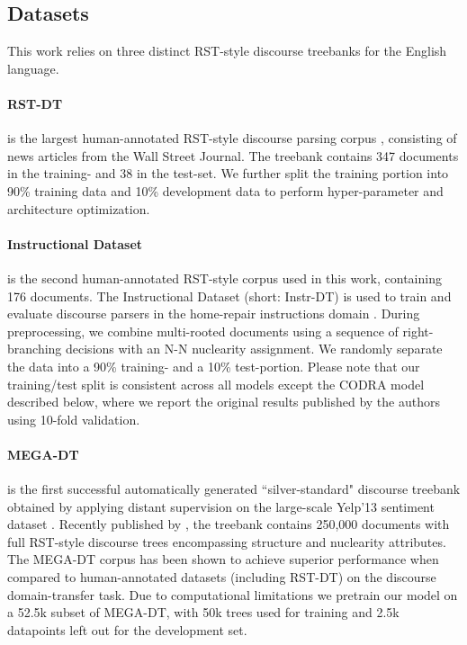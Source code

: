 \documentclass[11pt]{article}
\begin{document}
\subsection{Datasets}
\label{datasets}
This work relies on three distinct RST-style discourse treebanks for the English language. 

\paragraph{RST-DT} is the largest human-annotated RST-style discourse parsing corpus \cite{carlson2002rst}, consisting of news articles from the Wall Street Journal. The treebank contains 347 documents in the training- and 38 in the test-set. 
We further split the training portion into 90\% training data and 10\% development data to perform hyper-parameter and architecture optimization.

\paragraph{Instructional  Dataset} is the second human-annotated RST-style corpus used in this work, containing 176 documents. The Instructional Dataset (short: Instr-DT) is used to train and evaluate discourse parsers in the home-repair instructions domain \cite{subba2009effective}. During preprocessing, we combine multi-rooted documents using a sequence of right-branching decisions with an N-N nuclearity assignment. We randomly separate the data into a 90\% training- and a 10\% test-portion. Please note that our training/test split is consistent across all models except the CODRA model described below, where we report the original results published by the authors using 10-fold validation.

\paragraph{MEGA-DT} is the first successful automatically generated ``silver-standard" discourse treebank obtained by applying distant supervision on the large-scale Yelp'13 sentiment dataset \cite{tang2015document}. Recently published by , the treebank contains 250,000 documents with full RST-style discourse trees encompassing structure and nuclearity attributes. The MEGA-DT corpus has been shown to achieve superior performance when compared to human-annotated datasets (including RST-DT) on the discourse domain-transfer task. Due to computational limitations we pretrain our model on a 52.5k subset of MEGA-DT, with 50k trees used for training and 2.5k datapoints left out for the development set.
\end{document}
